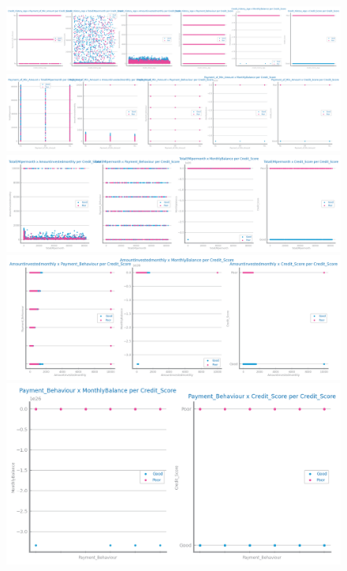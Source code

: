 \documentclass[10pt]{extarticle}
\begin{document}
\begin{figure}[H]
\includegraphics[scale=0.10]{images/dataset2/data_profiling/Credit_Score_sparsity_Credit_History_Age_per_class.png}
\includegraphics[scale=0.10]{images/dataset2/data_profiling/Credit_Score_sparsity_Payment_of_Min_Amount_per_class.png}
\includegraphics[scale=0.10]{images/dataset2/data_profiling/Credit_Score_sparsity_TotalEMIpermonth_per_class.png}
\includegraphics[scale=0.10]{images/dataset2/data_profiling/Credit_Score_sparsity_Amountinvestedmonthly_per_class.png}
\includegraphics[scale=0.10]{images/dataset2/data_profiling/Credit_Score_sparsity_Payment_Behaviour_per_class.png}

\end{figure}
\end{document}
